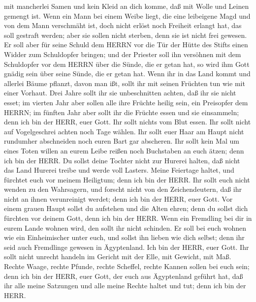mit mancherlei Samen und kein Kleid an dich komme, daß mit Wolle und
Leinen gemengt ist.  Wenn ein Mann bei einem Weibe liegt,
die eine leibeigene Magd und von dem Mann verschmäht ist, doch nicht
erlöst noch Freiheit erlangt hat, das soll gestraft werden; aber sie
sollen nicht sterben, denn sie ist nicht frei gewesen.  Er
soll aber für seine Schuld dem HERRN vor die Tür der Hütte des Stifts
einen Widder zum Schuldopfer bringen;  und der Priester
soll ihn versöhnen mit dem Schuldopfer vor dem HERRN über die Sünde, die
er getan hat, so wird ihm Gott gnädig sein über seine Sünde, die er
getan hat.  Wenn ihr in das Land kommt und allerlei Bäume
pflanzt, davon man ißt, sollt ihr mit seinen Früchten tun wie mit einer
Vorhaut. Drei Jahre sollt ihr sie unbeschnitten achten, daß ihr sie
nicht esset;  im vierten Jahr aber sollen alle ihre Früchte
heilig sein, ein Preisopfer dem HERRN;  im fünften Jahr
aber sollt ihr die Früchte essen und sie einsammeln; denn ich bin der
HERR, euer Gott.  Ihr sollt nichts vom Blut essen. Ihr
sollt nicht auf Vogelgeschrei achten noch Tage wählen.  Ihr
sollt euer Haar am Haupt nicht rundumher abschneiden noch euren Bart gar
abscheren.  Ihr sollt kein Mal um eines Toten willen an
eurem Leibe reißen noch Buchstaben an euch ätzen; denn ich bin der HERR.
 Du sollst deine Tochter nicht zur Hurerei halten, daß
nicht das Land Hurerei treibe und werde voll Lasters. 
Meine Feiertage haltet, und fürchtet euch vor meinem Heiligtum; denn ich
bin der HERR.  Ihr sollt euch nicht wenden zu den
Wahrsagern, und forscht nicht von den Zeichendeutern, daß ihr nicht an
ihnen verunreinigt werdet; denn ich bin der HERR, euer Gott.
 Vor einem grauen Haupt sollst du aufstehen und die Alten
ehren; denn du sollst dich fürchten vor deinem Gott, denn ich bin der
HERR.  Wenn ein Fremdling bei dir in eurem Lande wohnen
wird, den sollt ihr nicht schinden.  Er soll bei euch
wohnen wie ein Einheimischer unter euch, und sollst ihn lieben wie dich
selbst; denn ihr seid auch Fremdlinge gewesen in Ägyptenland. Ich bin
der HERR, euer Gott.  Ihr sollt nicht unrecht handeln im
Gericht mit der Elle, mit Gewicht, mit Maß.  Rechte Waage,
rechte Pfunde, rechte Scheffel, rechte Kannen sollen bei euch sein; denn
ich bin der HERR, euer Gott, der euch aus Ägyptenland geführt hat,
 daß ihr alle meine Satzungen und alle meine Rechte haltet
und tut; denn ich bin der HERR.

